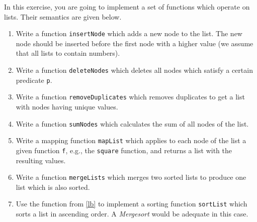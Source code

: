\documentclass [11pt, a4wide, twoside]{article}
\begin{document}
In this exercise, you are going to implement a set of functions which operate on lists. Their semantics are given below.

\begin{enumerate}
\renewcommand{\theenumi}{\alph{enumi}}
\item Write a function \verb+insertNode+ which adds a new node to the list. The new node should be inserted before the first node with a higher value (we assume that all lists to contain numbers).
\item Write a function \verb+deleteNodes+ which deletes all nodes which satisfy a certain predicate \verb+p+.
\item Write a function \verb+removeDuplicates+ which removes duplicates to get a list with nodes having unique values.
\item Write a function \verb+sumNodes+ which calculates the sum of all nodes of the list.
\item Write a mapping function \verb+mapList+ which applies to each node of the list a given function \texttt{f}, e.g., the \verb+square+ function, and returns a list with the resulting values.
\item Write a function \verb+mergeLists+ which merges two sorted lists to produce one list which is also sorted.\label{lb}
\item Use the function from \ref{lb} to implement a sorting function \verb+sortList+ which sorts a list in ascending order. A \emph{Mergesort} would be adequate in this case.
\end{enumerate}

\end{document}
